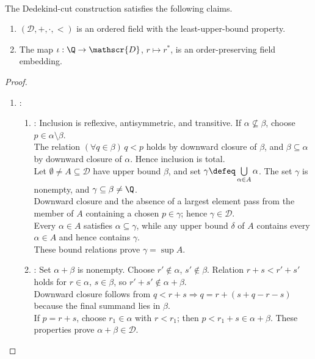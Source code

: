 \begin{theorem} \label{thm:real-field-existence-lub} \\
The Dedekind-cut construction satisfies the following claims.
\begin{enumerate}[label=(\roman*)]
\setlength{\itemsep}{0pt}
\item $(\mathscr{D},+,\cdot,<)$ is an ordered field with the least-upper-bound property.
\item The map $\iota:\Q\to\mathscr{D}$, $r\mapsto r^*$, is an order-preserving field embedding.
\end{enumerate}
\begin{proof}
\begin{enumerate}[label=(\roman*)]
\setlength{\itemsep}{0pt}
\item {}:
\begin{enumerate}[label=(\alph*)]
\setlength{\itemsep}{0pt}
\item {}: Inclusion is reflexive, antisymmetric, and transitive. If $\alpha\not\subseteq\beta$, choose $p\in\alpha\setminus\beta$.\\
The relation $(\forall q\in\beta)\,q<p$ holds by downward closure of $\beta$, and $\beta\subseteq\alpha$ by downward closure of $\alpha$. Hence inclusion is total.\\
Let $\emptyset\neq A\subseteq\mathscr{D}$ have upper bound $\beta$, and set $\gamma\defeq\bigcup\limits_{\alpha\in A}\alpha$. The set $\gamma$ is nonempty, and $\gamma\subseteq\beta\neq\Q$.\\
Downward closure and the absence of a largest element pass from the member of $A$ containing a chosen $p\in\gamma$; hence $\gamma\in\mathscr{D}$.\\
Every $\alpha\in A$ satisfies $\alpha\subseteq\gamma$, while any upper bound $\delta$ of $A$ contains every $\alpha\in A$ and hence contains $\gamma$.\\
These bound relations prove $\gamma=\sup A$.
\item {}: Set $\alpha+\beta$ is nonempty. Choose $r'\notin\alpha$,  $s'\notin\beta$. Relation $r+s<r'+s'$ holds for $r\in\alpha$, $s\in\beta$, so $r'+s'\notin\alpha+\beta$.\\
Downward closure follows from $q<r+s\Rightarrow q=r+(s+q-r-s)$ because the final summand lies in $\beta$.\\
If $p=r+s$, choose $r_1\in\alpha$ with $r<r_1$; then $p<r_1+s\in\alpha+\beta$. These properties prove $\alpha+\beta\in\mathscr{D}$.\\

\end{enumerate}
\end{enumerate}
\end{proof}
\end{theorem}
